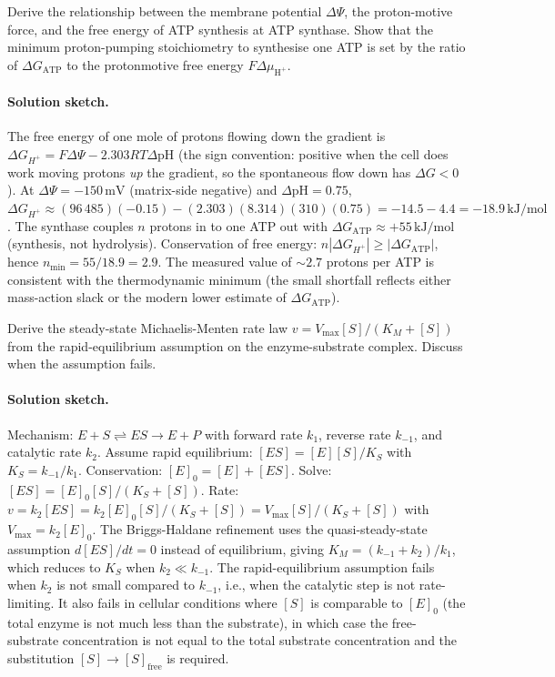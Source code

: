 \begin{exercise}
Derive the relationship between the membrane potential $\Delta \Psi$,
the proton-motive force, and the free energy of ATP synthesis at
ATP synthase. Show that the minimum proton-pumping stoichiometry to
synthesise one ATP is set by the ratio of $\Delta G_{\text{ATP}}$ to
the protonmotive free energy $F \Delta \mu_{\text{H}^+}$.
\end{exercise}

\paragraph{Solution sketch.}
The free energy of one mole of protons flowing down the gradient is
$\Delta G_{H^+} = F \Delta \Psi - 2.303 RT \Delta \text{pH}$ (the
sign convention: positive when the cell does work moving protons
\emph{up} the gradient, so the spontaneous flow down has $\Delta G <
0$). At $\Delta \Psi = -150\,\text{mV}$ (matrix-side negative) and
$\Delta \text{pH} = 0.75$, $\Delta G_{H^+} \approx (96\,485)(-0.15)
- (2.303)(8.314)(310)(0.75) = -14.5 - 4.4 = -18.9\,\text{kJ}/\text{mol}$.
The synthase couples $n$ protons in to one ATP out with
$\Delta G_{\text{ATP}} \approx +55\,\text{kJ}/\text{mol}$ (synthesis,
not hydrolysis). Conservation of free energy: $n |\Delta G_{H^+}|
\ge |\Delta G_{\text{ATP}}|$, hence $n_{\min} = 55/18.9 = 2.9$. The
measured value of $\sim 2.7$ protons per ATP
\cite{paper:v6c02-watt-stoichiometry-2010} is consistent with the
thermodynamic minimum (the small shortfall reflects either
mass-action slack or the modern lower estimate of $\Delta G_{\text{ATP}}$).

\begin{exercise}
Derive the steady-state Michaelis-Menten rate law
$v = V_{\max} [S]/(K_M + [S])$ from the rapid-equilibrium assumption
on the enzyme-substrate complex. Discuss when the assumption fails.
\end{exercise}

\paragraph{Solution sketch.}
Mechanism: $E + S \rightleftharpoons ES \rightarrow E + P$ with
forward rate $k_1$, reverse rate $k_{-1}$, and catalytic rate $k_2$.
Assume rapid equilibrium: $[ES] = [E][S]/K_S$ with $K_S = k_{-1}/k_1$.
Conservation: $[E]_0 = [E] + [ES]$. Solve: $[ES] = [E]_0 [S]/(K_S +
[S])$. Rate: $v = k_2 [ES] = k_2 [E]_0 [S]/(K_S + [S]) = V_{\max} [S]/
(K_S + [S])$ with $V_{\max} = k_2 [E]_0$. The Briggs-Haldane
refinement uses the quasi-steady-state assumption $d[ES]/dt = 0$
instead of equilibrium, giving $K_M = (k_{-1} + k_2)/k_1$, which
reduces to $K_S$ when $k_2 \ll k_{-1}$. The rapid-equilibrium
assumption fails when $k_2$ is not small compared to $k_{-1}$, i.e.,
when the catalytic step is not rate-limiting. It also fails in
cellular conditions where $[S]$ is comparable to $[E]_0$ (the total
enzyme is not much less than the substrate), in which case the
free-substrate concentration is not equal to the total substrate
concentration and the substitution $[S] \to [S]_{\text{free}}$ is
required.


